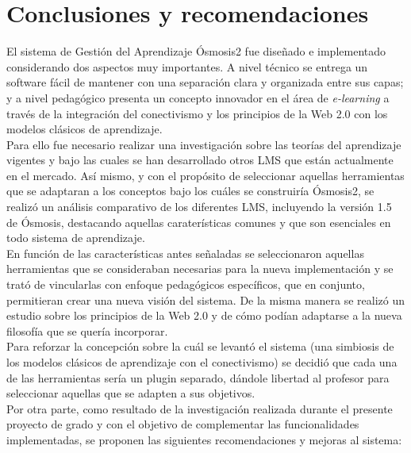 \chapter{Conclusiones y recomendaciones}
	El sistema de Gestión del Aprendizaje Ósmosis2 fue diseñado e implementado considerando dos aspectos muy importantes. A nivel técnico se entrega un software fácil de mantener con una separación clara y organizada entre sus capas; y a nivel pedagógico presenta un concepto innovador en el área de \emph{e-learning} a través de la integración del conectivismo y los principios de la Web 2.0 con los modelos clásicos de aprendizaje.\\
	
	Para ello fue necesario realizar una investigación sobre las teorías del aprendizaje vigentes y bajo las cuales se han desarrollado otros LMS que están actualmente en el mercado. Así mismo, y con el propósito de seleccionar aquellas herramientas que se adaptaran a los conceptos bajo los cuáles se construiría Ósmosis2, se realizó un análisis comparativo de los diferentes LMS, incluyendo la versión 1.5 de Ósmosis, destacando aquellas caraterísticas comunes y que son esenciales en todo sistema de aprendizaje.\\

	En función de las características antes señaladas se seleccionaron aquellas herramientas que se consideraban necesarias para la nueva implementación y se trató de vincularlas con enfoque pedagógicos específicos, que en conjunto, permitieran crear una nueva visión del sistema. De la misma manera se realizó un estudio sobre los principios de la Web 2.0 y de cómo podían adaptarse a la nueva filosofía que se quería incorporar. \\
	
	Para reforzar la concepción sobre la cuál se levantó el sistema (una simbiosis de los modelos clásicos de aprendizaje con el conectivismo) se decidió que cada una de las herramientas sería un plugin separado, dándole libertad al profesor para seleccionar aquellas que se adapten a sus objetivos. \\

	Por otra parte, como resultado de la investigación realizada durante el presente proyecto de grado y con el objetivo de complementar las funcionalidades implementadas, se proponen las siguientes recomendaciones y mejoras al sistema:

